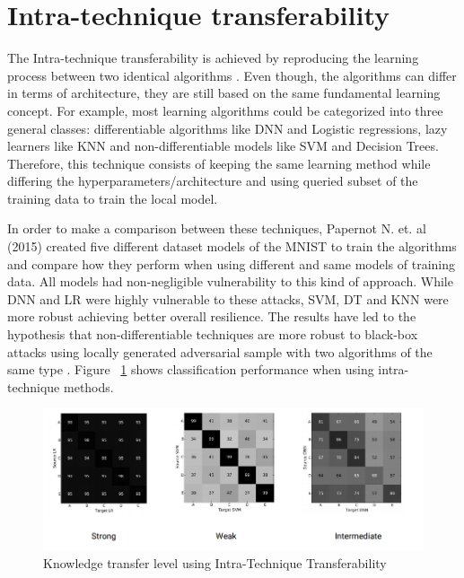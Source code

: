 \medskip



\section{Intra-technique transferability}\label{sec:intra}

The Intra-technique transferability is achieved by reproducing the learning process between two identical algorithms \cite{papernot2016transf}. Even though, the algorithms can differ in terms of architecture, they are still based on the same fundamental learning concept. For example, most learning algorithms could be categorized into three general classes: differentiable algorithms like DNN and Logistic regressions, lazy learners like KNN and non-differentiable models like SVM and Decision Trees. Therefore, this technique consists of keeping the same learning method while differing the hyperparameters/architecture and using queried subset of the training data to train the local model. 



In order to make a comparison between these techniques, Papernot N. et. al (2015) \cite{papernot2016transf} created five different dataset models of the MNIST to train the algorithms and compare how they perform when using different and same models of training data. All models had non-negligible vulnerability to this kind of approach. While DNN and LR were highly vulnerable to these attacks, SVM, DT and KNN were more robust achieving better overall resilience. The results have led to the hypothesis that non-differentiable techniques are more robust to black-box attacks using locally generated adversarial sample with two algorithms of the same type \cite{papernot2016}. Figure ~\ref{fig:intra} shows classification performance when using intra-technique methods.

\begin{figure}[!h]
\centering
	\includegraphics[scale=0.6]{intra.png}
\caption{Knowledge transfer level using Intra-Technique Transferability \cite{papernot2016transf}}
\label{fig:intra}
\end{figure}


